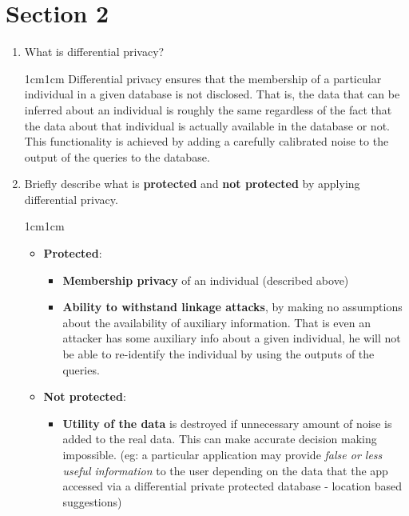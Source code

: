 \documentclass[11pt,letterpaper]{article}
\newenvironment{answer}{\em \color{blue} \begin{adjustwidth}{1cm}{1cm}}{\end{adjustwidth}}
\begin{document}
	\section*{Section 2}
	\begin{enumerate}
		
		\item What is differential privacy?
		
		\begin{answer}
			Differential privacy ensures that the membership of a particular individual in a given database is not disclosed. That is, the data that can be inferred about an individual is roughly the same regardless of the fact that the data about that individual is actually available in the database or not. This functionality is achieved by adding a carefully calibrated noise to the output of the queries to the database.
		\end{answer}
		
		\item Briefly describe what is \textbf{protected} and \textbf{not protected} by applying differential privacy.
		
		\begin{answer}
			\begin{itemize}
				\item \textbf{\sc Protected}:
				\begin{itemize}
					\item \textbf{Membership privacy} of an individual (described above)
					
					\item \textbf{Ability to withstand linkage attacks}, by making no assumptions about the availability of auxiliary information. That is even an attacker has some auxiliary info about a given individual, he will not be able to re-identify the individual by using the outputs of the queries.					
				\end{itemize} 
				
				\item \textbf{\sc Not protected}:
				\begin{itemize}
					\item \textbf{Utility of the data} is destroyed if unnecessary amount of noise is added to the real data. This can make accurate decision making impossible. (eg: a particular application may provide \textit{false or less useful information} to the user depending on the data that the app accessed via a differential private protected database - location based suggestions)
					

\end{itemize}
\end{itemize}
\end{answer}
\end{enumerate}
\end{document}
